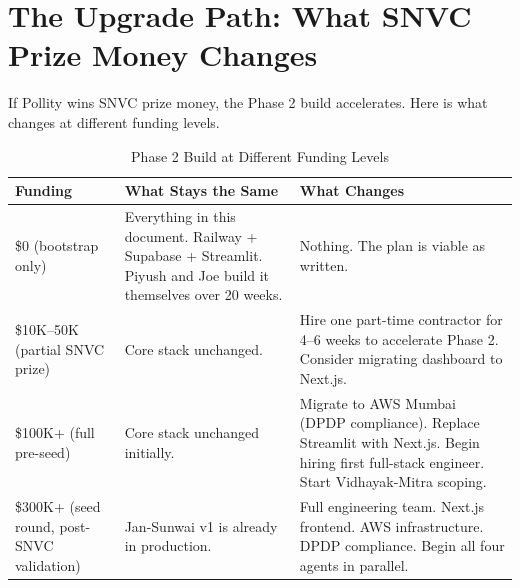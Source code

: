 \documentclass[12pt, a4paper]{article}
\begin{document}
\section{The Upgrade Path: What SNVC Prize Money Changes}

If Pollity wins SNVC prize money, the Phase 2 build accelerates.
Here is what changes at different funding levels.

\begin{table}[ht]
\centering
\caption{Phase 2 Build at Different Funding Levels}
\renewcommand{\arraystretch}{1.5}
\begin{tabularx}{\textwidth}{p{2.5cm} X X}
\toprule
\rowcolor{pollitylightblue}
\textbf{Funding} & \textbf{What Stays the Same} & \textbf{What Changes} \\
\midrule
\$0 (bootstrap only) & Everything in this document. Railway + Supabase + Streamlit. Piyush and Joe build it themselves over 20 weeks. & Nothing. The plan is viable as written. \\
\midrule
\$10K--50K (partial SNVC prize) & Core stack unchanged. & Hire one part-time contractor for 4--6 weeks to accelerate Phase 2. Consider migrating dashboard to Next.js. \\
\midrule
\$100K+ (full pre-seed) & Core stack unchanged initially. & Migrate to AWS Mumbai (DPDP compliance). Replace Streamlit with Next.js. Begin hiring first full-stack engineer. Start Vidhayak-Mitra scoping. \\
\midrule
\$300K+ (seed round, post-SNVC validation) & Jan-Sunwai v1 is already in production. & Full engineering team. Next.js frontend. AWS infrastructure. DPDP compliance. Begin all four agents in parallel. \\
\bottomrule
\end{tabularx}
\end{table}

\vspace{1em}
\end{document}
